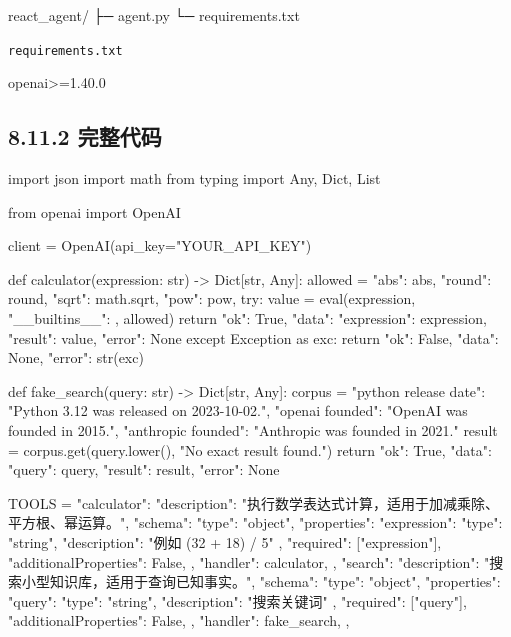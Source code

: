 \begin{codeblock}
react_agent/
├─ agent.py
└─ requirements.txt
\end{codeblock}

\texttt{requirements.txt}


\begin{codeblock}
openai>=1.40.0
\end{codeblock}

\subsection{8.11.2 完整代码}

\begin{codeblock}
import json
import math
from typing import Any, Dict, List

from openai import OpenAI


client = OpenAI(api_key="YOUR_API_KEY")


def calculator(expression: str) -> Dict[str, Any]:
    allowed = {
        "abs": abs,
        "round": round,
        "sqrt": math.sqrt,
        "pow": pow,
    }
    try:
        value = eval(expression, {"__builtins__": {}}, allowed)
        return {"ok": True, "data": {"expression": expression, "result": value}, "error": None}
    except Exception as exc:
        return {"ok": False, "data": None, "error": str(exc)}


def fake_search(query: str) -> Dict[str, Any]:
    corpus = {
        "python release date": "Python 3.12 was released on 2023-10-02.",
        "openai founded": "OpenAI was founded in 2015.",
        "anthropic founded": "Anthropic was founded in 2021."
    }
    result = corpus.get(query.lower(), "No exact result found.")
    return {"ok": True, "data": {"query": query, "result": result}, "error": None}


TOOLS = {
    "calculator": {
        "description": "执行数学表达式计算，适用于加减乘除、平方根、幂运算。",
        "schema": {
            "type": "object",
            "properties": {
                "expression": {"type": "string", "description": "例如 (32 + 18) / 5"}
            },
            "required": ["expression"],
            "additionalProperties": False,
        },
        "handler": calculator,
    },
    "search": {
        "description": "搜索小型知识库，适用于查询已知事实。",
        "schema": {
            "type": "object",
            "properties": {
                "query": {"type": "string", "description": "搜索关键词"}
            },
            "required": ["query"],
            "additionalProperties": False,
        },
        "handler": fake_search,
    },
}



\end{codeblock}
